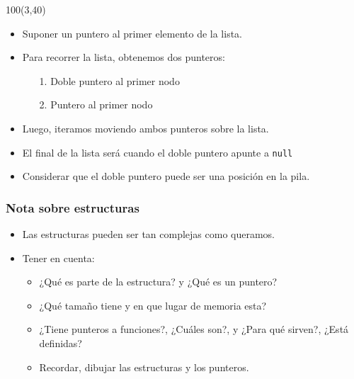 \documentclass[aspectratio=169]{beamer}
\begin{document}
\begin{frame}[fragile]
    \begin{textblock}{100}(3,40)
    \begin{itemize}
    \setlength\itemsep{0.2cm}
    \item<2->[-] \small Suponer un puntero al primer elemento de la lista.
    \item<3->[-] \small Para recorrer la lista, obtenemos dos punteros:
    \begin{itemize}
    \footnotesize
     \item[1.] Doble puntero al primer nodo
     \item[2.] Puntero al primer nodo
    \end{itemize}
    \item<4->[-] \small Luego, iteramos moviendo ambos punteros sobre la lista.
    \item<7->[-] \small El final de la lista será cuando el doble puntero apunte a \texttt{null}
    \item<8->[-] \small Considerar que el doble puntero puede ser una posición en la pila.
    \end{itemize}
    \end{textblock}
\end{frame}

\begin{frame}[fragile]
    \frametitle{Nota sobre estructuras}
    \large
    \begin{itemize}
    \setlength\itemsep{0.4cm}
    \item<1->[-] Las estructuras pueden ser tan complejas como queramos.
    \item<2->[-] Tener en cuenta:
    \begin{itemize}
    \vspace{0.4cm}
    \setlength\itemsep{0.4cm}
     \item<2->[$\cdot$] ¿Qué es parte de la estructura? y ¿Qué es un puntero?
     \item<3->[$\cdot$] ¿Qué tamaño tiene y en que lugar de memoria esta?
     \item<4->[$\cdot$] ¿Tiene punteros a funciones?, ¿Cuáles son?, y ¿Para qué sirven?, ¿Está definidas?
     \item<5->[$\cdot$] Recordar, dibujar las estructuras y los punteros.
    \end{itemize}
    \end{itemize}
\end{frame}
\end{document}
